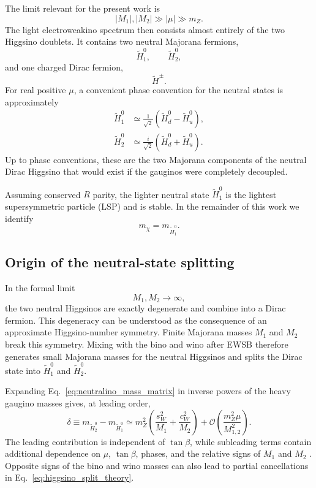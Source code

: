 \documentclass[aps,prd,reprint,superscriptaddress,nofootinbib,longbibliography,floatfix]{revtex4-2}
\begin{document}
The limit relevant for the present work is
\begin{equation}
|M_1|,|M_2|\gg|\mu|\gg m_Z.
\label{eq:pure_higgsino_limit}
\end{equation}
The light electroweakino spectrum then consists almost entirely of the two Higgsino doublets. It contains two neutral Majorana fermions,
\begin{equation}
\widetilde H_1^0,
\qquad
\widetilde H_2^0,
\end{equation}
and one charged Dirac fermion,
\begin{equation}
\widetilde H^\pm.
\end{equation}
For real positive $\mu$, a convenient phase convention for the neutral states is approximately
\begin{align}
\widetilde H_1^0
&\simeq
\frac{1}{\sqrt{2}}
\left(
\widetilde H_d^0-\widetilde H_u^0
\right),
\\
\widetilde H_2^0
&\simeq
\frac{i}{\sqrt{2}}
\left(
\widetilde H_d^0+\widetilde H_u^0
\right).
\label{eq:higgsino_mass_eigenstates}
\end{align}
Up to phase conventions, these are the two Majorana components of the neutral Dirac Higgsino that would exist if the gauginos were completely decoupled.

Assuming conserved $R$ parity, the lighter neutral state $\widetilde H_1^0$ is the lightest supersymmetric particle (LSP) and is stable. In the remainder of this work we identify
\begin{equation}
m_\chi=m_{\widetilde H_1^0}.
\end{equation}


\subsection{Origin of the neutral-state splitting}

In the formal limit
\begin{equation}
M_1,M_2\rightarrow\infty,
\end{equation}
the two neutral Higgsinos are exactly degenerate and combine into a Dirac fermion. This degeneracy can be understood as the consequence of an approximate Higgsino-number symmetry. Finite Majorana masses $M_1$ and $M_2$ break this symmetry. Mixing with the bino and wino after EWSB therefore generates small Majorana masses for the neutral Higgsinos and splits the Dirac state into $\widetilde H_1^0$ and $\widetilde H_2^0$.

Expanding Eq.~\eqref{eq:neutralino_mass_matrix} in inverse powers of the heavy gaugino masses gives, at leading order,
\begin{equation}
\delta
\equiv
m_{\widetilde H_2^0}
-
m_{\widetilde H_1^0}
\simeq
m_Z^2
\left(
\frac{s_W^2}{M_1}
+
\frac{c_W^2}{M_2}
\right)
+
\mathcal{O}
\left(
\frac{m_Z^2\mu}{M_{1,2}^2}
\right).
\label{eq:higgsino_split_theory}
\end{equation}
The leading contribution is independent of $\tan\beta$, while subleading terms contain additional dependence on $\mu$, $\tan\beta$, phases, and the relative signs of $M_1$ and $M_2$ \cite{NagataShirai2015,KrallReece2018}. Opposite signs of the bino and wino masses can also lead to partial cancellations in Eq.~\eqref{eq:higgsino_split_theory}.
\end{document}
